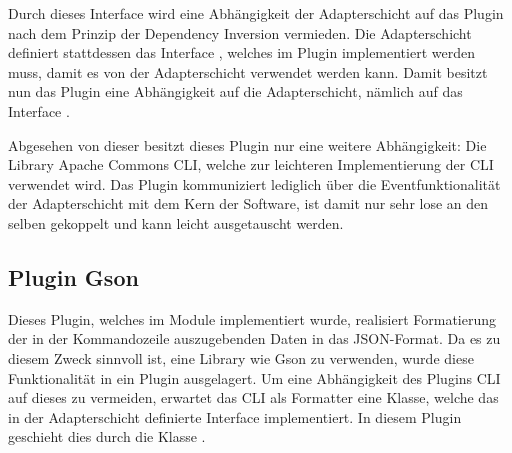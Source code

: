Durch dieses Interface wird eine Abhängigkeit der Adapterschicht auf das Plugin nach dem Prinzip der Dependency Inversion vermieden. Die Adapterschicht definiert stattdessen das Interface \href{https://github.com/anditru/quickie/blob/bb41442c7f1ffbfcd3117cd86a40f7932e543a33/1-quickie-adapters/src/main/java/org/pinkcrazyunicorn/quickie/adapters/UI.java}{}, welches im Plugin implementiert werden muss, damit es von der Adapterschicht verwendet werden kann. Damit besitzt nun das Plugin eine Abhängigkeit auf die Adapterschicht, nämlich auf das Interface \href{https://github.com/anditru/quickie/blob/bb41442c7f1ffbfcd3117cd86a40f7932e543a33/1-quickie-adapters/src/main/java/org/pinkcrazyunicorn/quickie/adapters/UI.java}{}. 

Abgesehen von dieser besitzt dieses Plugin nur eine weitere Abhängigkeit: Die Library Apache Commons CLI, welche zur leichteren Implementierung der \ac{CLI} verwendet wird. Das Plugin kommuniziert lediglich über die Eventfunktionalität der Adapterschicht mit dem Kern der Software, ist damit nur sehr lose an den selben gekoppelt und kann leicht ausgetauscht werden.

\subsection{Plugin Gson}
Dieses Plugin, welches im Module \href{https://github.com/anditru/quickie/tree/bb41442c7f1ffbfcd3117cd86a40f7932e543a33/0-quickie-plugin-gson}{} implementiert wurde, realisiert Formatierung der in der Kommandozeile auszugebenden Daten in das JSON-Format. Da es zu diesem Zweck sinnvoll ist, eine Library wie Gson zu verwenden, wurde diese Funktionalität in ein Plugin ausgelagert. Um eine Abhängigkeit des Plugins \acs{CLI} auf dieses zu vermeiden, erwartet das \ac{CLI} als Formatter eine Klasse, welche das in der Adapterschicht definierte Interface  implementiert. In diesem Plugin geschieht dies durch die Klasse .


